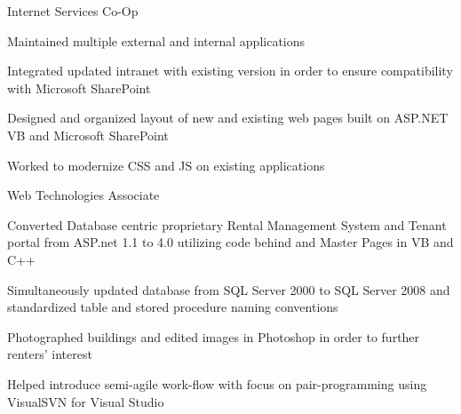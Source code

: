 \documentclass[]{alpha-cv}
\begin{document}
    
            {}
            {Internet Services Co-Op}
            {\begin{itemize}{
                \item{Maintained multiple external and internal applications}
                \item{Integrated updated intranet with existing version in order to ensure compatibility with Microsoft SharePoint}
                \item{Designed and organized layout of new and existing web pages built on ASP.NET VB and Microsoft SharePoint}
                \item{Worked to modernize CSS and JS on existing applications}
            }
            \end{itemize}}


            {}
            {Web Technologies Associate}
            {\begin{itemize}{
                \item{Converted Database centric proprietary Rental Management System and Tenant portal from ASP.net 1.1 to 4.0 utilizing code behind and Master Pages in VB and C++}
                \item{Simultaneously updated database from SQL Server 2000 to SQL Server 2008 and standardized table and stored procedure naming conventions}
                \item{Photographed buildings and edited images in Photoshop in order to further renters' interest}
                \item{Helped introduce semi-agile work-flow with focus on pair-programming using VisualSVN for Visual Studio}
            }
            \end{itemize}}
            
\end{document}
